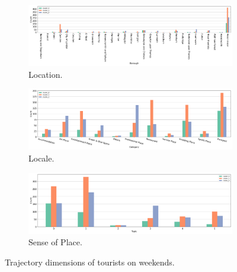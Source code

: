 \documentclass{article}
\theoremstyle{remark}
\begin{document}
\begin{figure}[!h]

\centering
\begin{subfigure}{0.6\textheight}
\centering
\includegraphics[width=1\linewidth]{figures/traj_location_weekend_tourists.png}
\caption{Location.}
\label{fig:traj_location_weekend_tourists}
\end{subfigure}
\begin{subfigure}{0.6\textheight}
\centering
\includegraphics[width=1\linewidth]{figures/traj_locale_weekend_tourists.png}
\caption{Locale.}
\label{fig:traj_locale_weekend_tourists}
\end{subfigure}
\begin{subfigure}{0.6\textheight}
\centering
\includegraphics[width=1\linewidth]{figures/traj_sense_weekend_tourists.png}
\caption{Sense of Place.}
\label{fig:traj_sense_weekend_tourists}
\end{subfigure}

\caption{Trajectory dimensions of tourists on weekends.}
\label{fig:traj_dimension_weekend_tourists}
\end{figure}


\clearpage


\end{document}
